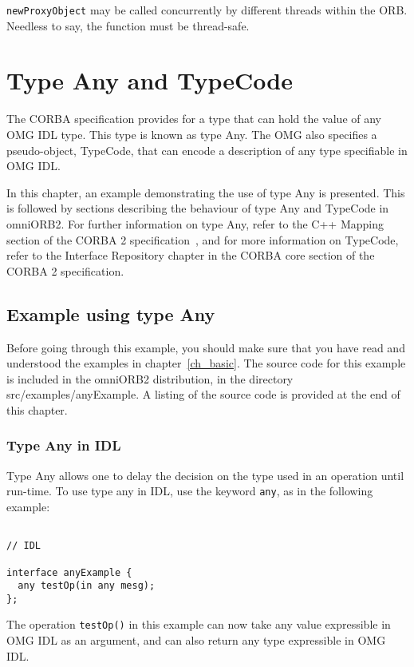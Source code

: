 \documentclass[11pt,twoside,onecolumn]{book}
\begin{document}
{\tt newProxyObject} may be called concurrently by different threads within
the ORB. Needless to say, the function must be thread-safe.


\chapter{Type Any and TypeCode}

The CORBA specification provides for a type that can hold the value of any 
OMG IDL type. This type is known as type Any. The OMG also specifies a 
pseudo-object, TypeCode, that can encode a description of any type specifiable
in OMG IDL.

In this chapter, an example demonstrating the use of type Any is presented. 
This is followed by sections describing the behaviour of type Any and TypeCode 
in omniORB2. 
For further information on type Any, refer to the C++ Mapping section of the 
CORBA 2 specification~\cite{corba2-spec}, and for more information on 
TypeCode, refer to the Interface Repository chapter in the CORBA core section 
of the CORBA 2 specification. 

\section{Example using type Any}

Before going through this example, you should make sure that you have read 
and understood the examples in chapter~\ref{ch_basic}.
The source code for this example is included in the omniORB2 distribution,
in the directory src/examples/anyExample. A listing of the source code is
provided at the end of this chapter.

\subsection{Type Any in IDL}
Type Any allows one to delay the decision on the type used in an operation 
until run-time. To use type any in IDL, use the keyword {\tt any}, as in the 
following example:
{\small
\begin{verbatim}

// IDL

interface anyExample {
  any testOp(in any mesg);
};

\end{verbatim}
}

The operation {\tt testOp()} in this example can now take any value 
expressible in OMG IDL as an argument, and can also return any type 
expressible in OMG IDL.
\end{document}
